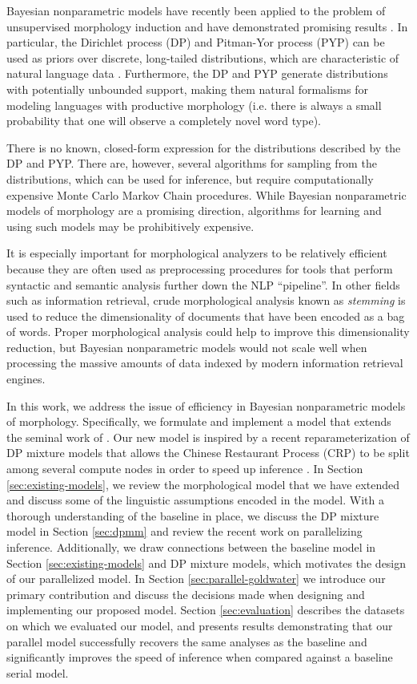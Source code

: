 Bayesian nonparametric models have recently been applied to the
problem of unsupervised morphology induction and have demonstrated
promising results \cite{goldwater2011,dreyer2011,lee2011}. In
particular, the Dirichlet process (DP) and Pitman-Yor process (PYP)
can be used as priors over discrete, long-tailed distributions, which
are characteristic of natural language data
\cite{goldwater2011}. Furthermore, the DP and PYP generate
distributions with potentially unbounded support, making them natural
formalisms for modeling languages with productive morphology
(i.e. there is always a small probability that one will observe a
completely novel word type).

There is no known, closed-form expression for the distributions
described by the DP and PYP. There are, however, several algorithms
for sampling from the distributions, which can be used for inference,
but require computationally expensive Monte Carlo Markov Chain
procedures. While Bayesian nonparametric models of morphology are a
promising direction, algorithms for learning and using such models may
be prohibitively expensive.

It is especially important for morphological analyzers to be
relatively efficient because they are often used as preprocessing
procedures for tools that perform syntactic and semantic analysis
further down the NLP ``pipeline''. In other fields such as information
retrieval, crude morphological analysis known as \textit{stemming} is
used to reduce the dimensionality of documents that have been encoded
as a bag of words. Proper morphological analysis could help to improve
this dimensionality reduction, but Bayesian nonparametric models would
not scale well when processing the massive amounts of data indexed by
modern information retrieval engines.

In this work, we address the issue of efficiency in Bayesian
nonparametric models of morphology. Specifically, we formulate and
implement a model that extends the seminal work of
\cite{goldwater2011}. Our new model is inspired by a recent
reparameterization of DP mixture models that allows the Chinese
Restaurant Process (CRP) to be split among several compute nodes in
order to speed up inference \cite{williamson2013}. In Section
\ref{sec:existing-models}, we review the morphological model that we
have extended and discuss some of the linguistic assumptions encoded
in the model. With a thorough understanding of the baseline in place,
we discuss the DP mixture model in Section \ref{sec:dpmm} and review
the recent work on parallelizing inference. Additionally, we draw
connections between the baseline model in Section
\ref{sec:existing-models} and DP mixture models, which motivates the
design of our parallelized model. In Section
\ref{sec:parallel-goldwater} we introduce our primary contribution and
discuss the decisions made when designing and implementing our
proposed model. Section \ref{sec:evaluation} describes the datasets on
which we evaluated our model, and presents results demonstrating that
our parallel model successfully recovers the same analyses as the
baseline and significantly improves the speed of inference when
compared against a baseline serial model.
